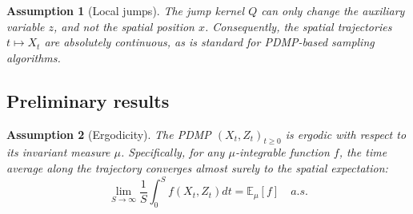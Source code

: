 \documentclass{article}
\newtheorem{assumption}{Assumption}
\begin{document}

\begin{assumption}[Local jumps]
    The jump kernel $Q$ can only change the auxiliary variable $z$, and not the spatial position $x$. Consequently, the spatial trajectories $t \mapsto X_t$ are absolutely continuous, as is standard for PDMP-based sampling algorithms.
\end{assumption}

\subsection{Preliminary results}

\begin{assumption}[Ergodicity]
    \label{assum:ergodicity}
    The PDMP $(X_t, Z_t)_{t \geq 0}$ is ergodic with respect to its invariant measure $\mu$. Specifically, for any $\mu$-integrable function $f$, the time average along the trajectory converges almost surely to the spatial expectation:
    \[
        \lim_{S \to \infty} \frac{1}{S} \int_0^S f(X_t, Z_t) dt = \mathbb{E}_\mu[f] \quad a.s.
    \]
\end{assumption}
\end{document}
